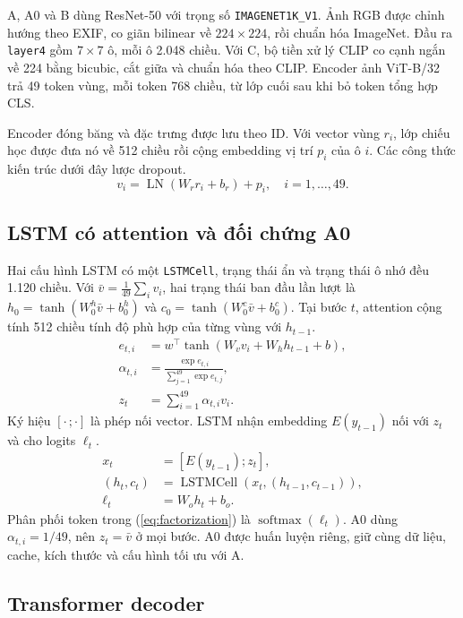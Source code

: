 \documentclass[a4paper,11pt]{article}
\newcommand{\modelA}{\textsc{A}}
\newcommand{\modelB}{\textsc{B}}
\newcommand{\modelAz}{\textsc{A0}}
\newcommand{\modelC}{\textsc{C}}
\begin{document}
\modelA{}, \modelAz{} và \modelB{} dùng ResNet-50 \citep{he2016deep} với trọng số \texttt{IMAGENET1K\_V1}. Ảnh RGB được chỉnh hướng theo EXIF, co giãn bilinear về $224\times224$, rồi chuẩn hóa ImageNet. Đầu ra \texttt{layer4} gồm $7\times7$ ô, mỗi ô 2.048 chiều. Với \modelC{}, bộ tiền xử lý CLIP co cạnh ngắn về 224 bằng bicubic, cắt giữa và chuẩn hóa theo CLIP. Encoder ảnh ViT-B/32 trả 49 token vùng, mỗi token 768 chiều, từ lớp cuối sau khi bỏ token tổng hợp CLS.

Encoder đóng băng và đặc trưng được lưu theo ID. Với vector vùng $r_i$, lớp chiếu học được đưa nó về 512 chiều rồi cộng embedding vị trí $p_i$ của ô $i$. Các công thức kiến trúc dưới đây lược dropout.
\begin{equation}
  v_i=\operatorname{LN}(W_r r_i+b_r)+p_i,
  \quad i=1,\ldots,49.
  \label{eq:projection}
\end{equation}

\subsection{LSTM có attention và đối chứng A0}

Hai cấu hình LSTM có một \texttt{LSTMCell}, trạng thái ẩn và trạng thái ô nhớ đều 1.120 chiều. Với $\bar v=\frac1{49}\sum_i v_i$, hai trạng thái ban đầu lần lượt là $h_0=\tanh(W_0^h\bar v+b_0^h)$ và $c_0=\tanh(W_0^c\bar v+b_0^c)$. Tại bước $t$, attention cộng tính 512 chiều tính độ phù hợp của từng vùng với $h_{t-1}$.
\begin{align}
  e_{t,i} &= w^\top\tanh(W_vv_i+W_hh_{t-1}+b),\\
  \alpha_{t,i} &= \frac{\exp e_{t,i}}{\sum_{j=1}^{49}\exp e_{t,j}},\\
  z_t &= \sum_{i=1}^{49}\alpha_{t,i}v_i.
\end{align}
Ký hiệu $[\cdot\,;\cdot]$ là phép nối vector. LSTM nhận embedding $E(y_{t-1})$ nối với $z_t$ và cho logits $\ell_t$.
\begin{align}
  x_t &= [E(y_{t-1});z_t],\\
  (h_t,c_t)&=\operatorname{LSTMCell}(x_t,(h_{t-1},c_{t-1})),\\
  \ell_t &= W_o h_t+b_o .
\end{align}
Phân phối token trong (\ref{eq:factorization}) là $\operatorname{softmax}(\ell_t)$. \modelAz{} dùng $\alpha_{t,i}=1/49$, nên $z_t=\bar v$ ở mọi bước. \modelAz{} được huấn luyện riêng, giữ cùng dữ liệu, cache, kích thước và cấu hình tối ưu với \modelA{}.

\subsection{Transformer decoder}
\end{document}
